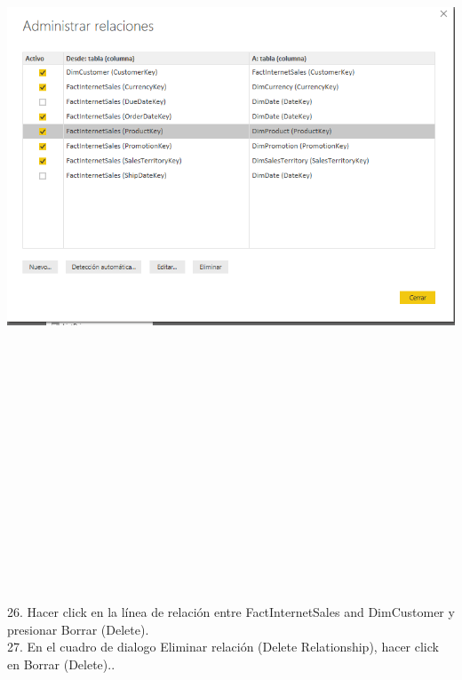 \begin{flushleft}
\begin{itemize}
\textbf{ }\\
\begin{center}
	\includegraphics[width=20cm]{./Imagenes/img7} 
	\end{center}
\textbf{ }\\
\textbf{ }\\
\textbf{ }\\
\textbf{ }\\
\textbf{ }\\
\textbf{ }\\
\textbf{ }\\
\textbf{ }\\
\textbf{ }\\
\textbf{ }\\
\textbf{ }\\
\textbf{ }\\
\textbf{ }\\
\textbf{ }\\

\textbf{ }\\

26. Hacer click en la línea de relación entre FactInternetSales and DimCustomer y presionar Borrar (Delete).\\
27. En el cuadro de dialogo Eliminar relación (Delete Relationship), hacer click en Borrar (Delete)..\\
\textbf{ }\\


\end{itemize}
\end{flushleft}
